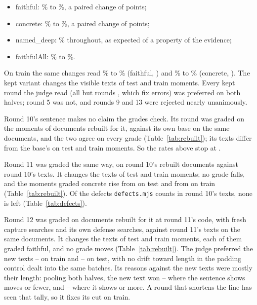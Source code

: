 \documentclass[11pt]{article}
\begin{document}
\begin{itemize}[nosep]
\item faithful: \BaseTestFaithfulCI\% to \KeptTestFaithfulCI\%, a paired change of
\KeptTestFaithfulVsBase{} points;
\item concrete: \BaseTestConcreteCI\% to \KeptTestConcreteCI\%, a paired change of
\KeptTestConcreteVsBase{} points;
\item named\_deep: \BaseTestNamedDeepCI\% throughout, as expected of a property of the evidence;
\item faithfulAll: \BaseTestFaithfulAllCI\% to \KeptTestFaithfulAllCI\%.
\end{itemize}

On train the same changes read \BaseTrainFaithful\% to \KeptTrainFaithful\% (faithful,
\KeptTrainFaithfulVsBase) and \BaseTrainConcrete\% to \KeptTrainConcrete\% (concrete,
\KeptTrainConcreteVsBase). The kept variant changes the visible texts of \KeptTestTextsChanged{}
test and \KeptTrainTextsChanged{} train moments. Every kept round the judge read (all but rounds
\UnjudgedKept, which fix errors) was preferred on both halves; round 5 was not, and rounds 9 and 13
were rejected nearly unanimously.

Round 10's sentence makes no claim the grades check. Its round was graded on the \RoundTenMoments{}
moments of documents rebuilt for it, against its own base on the same documents, and the two
agree on every grade (Table~\ref{tab:rebuilt}); its texts differ from the base's on
\RoundTenChangedTest{} test and \RoundTenChangedTrain{} train moments. So the rates above stop at
\KeptVariant.

Round 11 was graded the same way, on round 10's rebuilt documents against round 10's texts. It
changes the texts of \RoundElevenChangedTest{} test and \RoundElevenChangedTrain{} train moments;
no grade falls, and the moments graded concrete rise from \RoundElevenConcreteTest{} on test and
from \RoundElevenConcreteTrain{} on train (Table~\ref{tab:rebuilt}). Of the \RoundElevenDefects{}
defects \texttt{defects.mjs} counts in round 10's texts, none is left (Table~\ref{tab:defects}).

Round 12 was graded on documents rebuilt for it at round 11's code, with fresh capture searches
and its own defense searches, against round 11's texts on the same documents. It changes the
texts of \RoundTwelveChangedTest{} test and \RoundTwelveChangedTrain{} train moments, each of them
graded faithful, and no grade moves (Table~\ref{tab:rebuilt}). The judge preferred the new texts
\RoundTwelveTrainNew--\RoundTwelveTrainOld{} on train and \RoundTwelveTestNew--\RoundTwelveTestOld{}
on test, with no drift toward length in the padding control dealt into the same batches. Its
reasons against the new texts were mostly their length: pooling both halves, the new text won
\RoundTwelveShortNew--\RoundTwelveShortOld{} where the sentence shows \RoundTwelveShortMax{} moves
or fewer, and \RoundTwelveLongNew--\RoundTwelveLongOld{} where it shows \RoundTwelveLongMin{} or
more. A round that shortens the line has seen that tally, so it fixes its cut on train.
\end{document}
